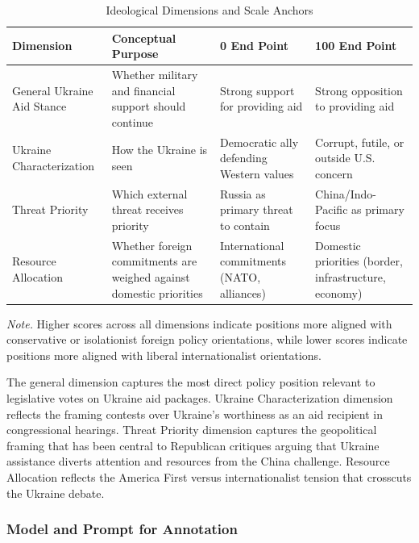 \begin{table}[htbp]
\centering
\small
\begin{threeparttable}
\caption{Ideological Dimensions and Scale Anchors}
\label{tab:1}
\begin{tabularx}{\textwidth}{@{}L{0.95}L{1.15}L{0.95}L{0.95}@{}}
\toprule
\textbf{Dimension} & \textbf{Conceptual Purpose} & \textbf{0 End Point} & \textbf{100 End Point} \\
\midrule
General Ukraine Aid Stance & Whether military and financial support should continue & Strong support for providing aid & Strong opposition to providing aid \\
Ukraine Characterization & How the Ukraine is seen & Democratic ally defending Western values & Corrupt, futile, or outside U.S. concern \\
Threat Priority & Which external threat receives priority & Russia as primary threat to contain & China/Indo-Pacific as primary focus \\
Resource Allocation & Whether foreign commitments are weighed against domestic priorities & International commitments (NATO, alliances) & Domestic priorities (border, infrastructure, economy) \\
\bottomrule
\end{tabularx}
\begin{tablenotes}[flushleft]\footnotesize
\item \textit{Note.} Higher scores across all dimensions indicate positions more aligned with conservative or isolationist foreign policy orientations, while lower scores indicate positions more aligned with liberal internationalist orientations.
\end{tablenotes}
\end{threeparttable}
\end{table}


The general dimension captures the most direct policy position relevant to legislative votes on Ukraine aid packages. Ukraine Characterization dimension reflects the framing contests over Ukraine's worthiness as an aid recipient in congressional hearings. Threat Priority dimension captures the geopolitical framing that has been central to Republican critiques arguing that Ukraine assistance diverts attention and resources from the China challenge. Resource Allocation reflects the America First versus internationalist tension that crosscuts the Ukraine debate.

\subsubsection{Model and Prompt for Annotation}


